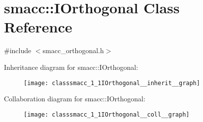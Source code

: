 \hypertarget{classsmacc_1_1IOrthogonal}{}\section{smacc\+:\+:I\+Orthogonal Class Reference}
\label{classsmacc_1_1IOrthogonal}


{\ttfamily \#include $<$smacc\+\_\+orthogonal.\+h$>$}



Inheritance diagram for smacc\+:\+:I\+Orthogonal\+:
\nopagebreak
\begin{figure}[H]
\begin{center}
\leavevmode
\texttt{[image: classsmacc\_1\_1IOrthogonal\_\_inherit\_\_graph]}
\end{center}
\end{figure}


Collaboration diagram for smacc\+:\+:I\+Orthogonal\+:
\nopagebreak
\begin{figure}[H]
\begin{center}
\leavevmode
\texttt{[image: classsmacc\_1\_1IOrthogonal\_\_coll\_\_graph]}
\end{center}
\end{figure}
